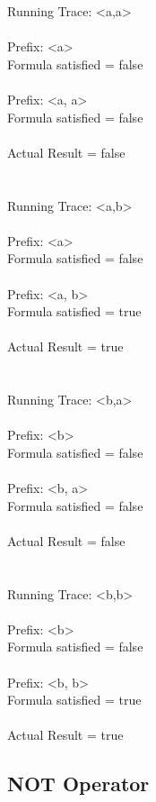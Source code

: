 \noindent Running Trace: \textless a,a\textgreater\\
\\
  Prefix: \textless a\textgreater\\
  Formula satisfied = false\\
\\
  Prefix: \textless a, a\textgreater\\
  Formula satisfied = false\\
\\
  Actual Result = false\\
\\
\\
Running Trace: \textless a,b\textgreater\\
\\
  Prefix: \textless a\textgreater\\
  Formula satisfied = false\\
\\
  Prefix: \textless a, b\textgreater\\
  Formula satisfied = true\\
\\
  Actual Result = true\\
\\
\\
Running Trace: \textless b,a\textgreater\\
\\
  Prefix: \textless b\textgreater\\
  Formula satisfied = false\\
\\
  Prefix: \textless b, a\textgreater\\
  Formula satisfied = false\\
\\
  Actual Result = false\\
\\
\\
Running Trace: \textless b,b\textgreater\\
\\
  Prefix: \textless b\textgreater\\
  Formula satisfied = false\\
\\
  Prefix: \textless b, b\textgreater\\
  Formula satisfied = true\\
\\
  Actual Result = true\\

\subsection{NOT Operator}

